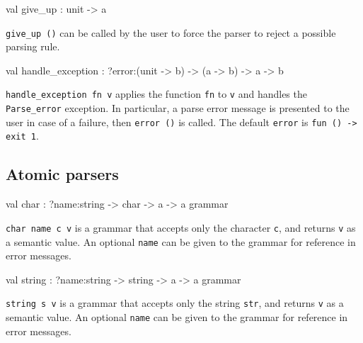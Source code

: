 \documentclass[11pt]{article}
\begin{document}
\label{val:Earley.give-underscoreup}\begin{ocamldoccode}
val give_up : unit -> {\textquotesingle}a
\end{ocamldoccode}
\begin{ocamldocdescription}
{\tt{give\_up ()}} can be called by the user to force the parser to reject
    a possible parsing rule.


\end{ocamldocdescription}




\label{val:Earley.handle-underscoreexception}\begin{ocamldoccode}
val handle_exception : ?error:(unit -> {\textquotesingle}b) -> ({\textquotesingle}a -> {\textquotesingle}b) -> {\textquotesingle}a -> {\textquotesingle}b
\end{ocamldoccode}
\begin{ocamldocdescription}
{\tt{handle\_exception fn v}} applies the function {\tt{fn}} to {\tt{v}} and handles
    the {\tt{Parse\_error}} exception. In particular, a parse error message is
    presented to the user in  case  of  a  failure, then {\tt{error ()}}
    is called. The default {\tt{error}} is {\tt{fun () -> exit 1}}.


\end{ocamldocdescription}




\subsection{Atomic parsers}




\label{val:Earley.char}\begin{ocamldoccode}
val char : ?name:string -> char -> {\textquotesingle}a -> {\textquotesingle}a grammar
\end{ocamldoccode}
\begin{ocamldocdescription}
{\tt{char {}name c v}} is a grammar that accepts only the  character  {\tt{c}},
    and returns {\tt{v}} as a semantic value. An optional {\tt{name}} can be given
    to the grammar for reference in error messages.


\end{ocamldocdescription}




\label{val:Earley.string}\begin{ocamldoccode}
val string : ?name:string -> string -> {\textquotesingle}a -> {\textquotesingle}a grammar
\end{ocamldoccode}
\begin{ocamldocdescription}
{\tt{string s v}} is a grammar that accepts only the  string  {\tt{str}},  and
    returns {\tt{v}} as a semantic value. An optional {\tt{name}} can be given  to
    the grammar for reference in error messages.


\end{ocamldocdescription}
\end{document}
